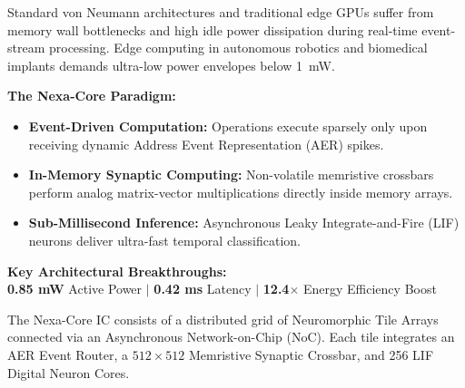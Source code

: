 \documentclass[final]{beamer}
\begin{document}
\begin{frame}[t]
\vspace{15pt}

\begin{minipage}[t]{0.31\textwidth}
  \begin{tcolorbox}[posterbox, title={\faBrain \;\; Introduction \& Motivation}]
    Standard von Neumann architectures and traditional edge GPUs suffer from memory wall bottlenecks and high idle power dissipation during real-time event-stream processing. Edge computing in autonomous robotics and biomedical implants demands ultra-low power envelopes below 1~mW.

    \vspace{8pt}
    \textbf{\textcolor{TextWhite}{The Nexa-Core Paradigm:}}
    \begin{itemize}
      \item[\textcolor{BorderCyan}{\faCheckCircle}] \textbf{Event-Driven Computation:} Operations execute sparsely only upon receiving dynamic Address Event Representation (AER) spikes.
      \item[\textcolor{BorderCyan}{\faCheckCircle}] \textbf{In-Memory Synaptic Computing:} Non-volatile memristive crossbars perform analog matrix-vector multiplications directly inside memory arrays.
      \item[\textcolor{BorderCyan}{\faCheckCircle}] \textbf{Sub-Millisecond Inference:} Asynchronous Leaky Integrate-and-Fire (LIF) neurons deliver ultra-fast temporal classification.
    \end{itemize}

    \vspace{10pt}
    \begin{tcolorbox}[
      enhanced,
      colback=HeaderBg,
      colframe=BorderEmerald,
      arc=6pt,
      boxrule=1pt,
      top=10pt,
      bottom=10pt
    ]
      \centering
      \textbf{\textcolor{BorderEmerald}{\faBolt \; Key Architectural Breakthroughs:}}\\[6pt]
      \textcolor{TextWhite}{\textbf{0.85 mW}} Active Power \quad$\vert$\quad
      \textcolor{TextWhite}{\textbf{0.42 ms}} Latency \quad$\vert$\quad
      \textcolor{TextWhite}{\textbf{12.4$\times$}} Energy Efficiency Boost
    \end{tcolorbox}
  \end{tcolorbox}

  \vspace{15pt}

  \begin{tcolorbox}[posterbox, title={\faLayerGroup \;\; Microarchitecture \& Synapse Fabric}]
    The Nexa-Core IC consists of a distributed grid of Neuromorphic Tile Arrays connected via an Asynchronous Network-on-Chip (NoC). Each tile integrates an AER Event Router, a $512 \times 512$ Memristive Synaptic Crossbar, and 256 LIF Digital Neuron Cores.


\end{tcolorbox}
\end{minipage}
\end{frame}
\end{document}
